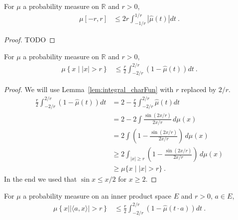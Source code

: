 \begin{lemma}\label{lem:charFun_bound_small}
\leanok
{}
For $\mu$ a probability measure on $\mathbb{R}$ and $r > 0$,
\begin{align*}
\mu [-r, r]
&\le 2 r \int_{-1/r}^{1/r} |\hat{\mu}(t)| dt
\: .
\end{align*}
\end{lemma}

\begin{proof}
TODO
\end{proof}


\begin{lemma}\label{lem:charFun_bound_large}
\leanok
{}
For $\mu$ a probability measure on $\mathbb{R}$ and $r > 0$,
\begin{align*}
\mu \left\{x \mid |x| > r\right\}
&\le \frac{r}{2} \int_{-2/r}^{2/r} (1 - \hat{\mu}(t))dt
\: .
\end{align*}
\end{lemma}

\begin{proof}
\leanok
We will use Lemma~\ref{lem:integral_charFun} with $r$ replaced by $2/r$.
\begin{align*}
    \frac{r}{2} \int_{-2/r}^{2/r} (1 - \hat{\mu}(t))dt
    &= 2 - \frac{r}{2} \int_{-2/r}^{2/r} \hat{\mu}(t)dt
    \\
    &= 2 - 2 \int \frac{\sin(2 x / r)}{2 x / r} \, d\mu(x)
    \\
    &= 2 \int \left(1 - \frac{\sin(2 x / r)}{2 x / r}\right) \, d\mu(x)
    \\
    &\ge 2 \int_{|x| \ge r} \left(1 - \frac{\sin(2 x / r)}{2 x / r}\right) \, d\mu(x)
    \\
    &\ge \mu\{x \mid |x| > r\}
    \: .
\end{align*}
In the end we used that $\sin x \le x /2$ for $x \ge 2$.
\end{proof}


\begin{lemma}\label{lem:charFun_bound_inner}
\leanok
{}
For $\mu$ a probability measure on an inner product space $E$ and $r > 0$, $a \in E$,
\begin{align*}
\mu \left\{x \mid \vert\langle a, x\rangle\vert > r\right\}
&\le \frac{r}{2} \int_{-2/r}^{2/r} (1 - \hat{\mu}(t \cdot a))dt
\: .
\end{align*}
\end{lemma}

